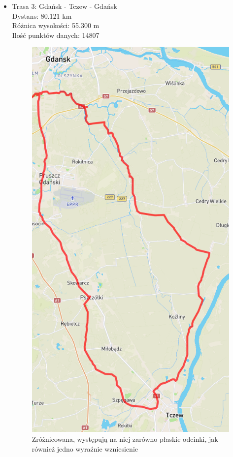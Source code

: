 \documentclass{article}
\begin{document}
\begin{multicols}{2}
\begin{itemize}
        \item Trasa 3: Gdańsk - Tczew - Gdańsk \\
        Dystans: 80.121 km \\
        Różnica wysokości: 55.300 m \\
        Ilość punktów danych: 14807
        \begin{figure}[H]
            \centering
            \captionsetup{justification=centering, width=0.8\linewidth}
            \includegraphics[height=0.35\textheight]{routes/tczew.png}
            \caption*{Zróżnicowana, występują na niej zarówno płaskie odcinki,
            jak również jedno wyraźnie wzniesienie}
        \end{figure}
    \end{itemize}
\end{multicols}
\end{document}
